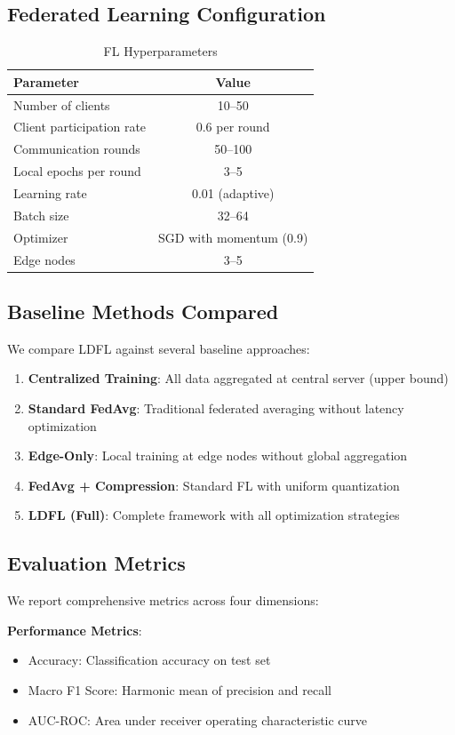 \documentclass[10pt,conference]{IEEEtran}
\begin{document}
\subsection{Federated Learning Configuration}
\begin{table}[h]
\centering
\caption{FL Hyperparameters}
\label{tab:hyperparams}
\begin{tabular}{lc}
\toprule
Parameter & Value \\
\midrule
Number of clients & 10--50 \\
Client participation rate & 0.6 per round \\
Communication rounds & 50--100 \\
Local epochs per round & 3--5 \\
Learning rate & 0.01 (adaptive) \\
Batch size & 32--64 \\
Optimizer & SGD with momentum (0.9) \\
Edge nodes & 3--5 \\
\bottomrule
\end{tabular}
\end{table}

\subsection{Baseline Methods Compared}
We compare LDFL against several baseline approaches:
\begin{enumerate}
    \item \textbf{Centralized Training}: All data aggregated at central server (upper bound)
    \item \textbf{Standard FedAvg}: Traditional federated averaging without latency optimization
    \item \textbf{Edge-Only}: Local training at edge nodes without global aggregation
    \item \textbf{FedAvg + Compression}: Standard FL with uniform quantization
    \item \textbf{LDFL (Full)}: Complete framework with all optimization strategies
\end{enumerate}

\subsection{Evaluation Metrics}
We report comprehensive metrics across four dimensions:

\textbf{Performance Metrics}:
\begin{itemize}
    \item Accuracy: Classification accuracy on test set
    \item Macro F1 Score: Harmonic mean of precision and recall
    \item AUC-ROC: Area under receiver operating characteristic curve
\end{itemize}
\end{document}
